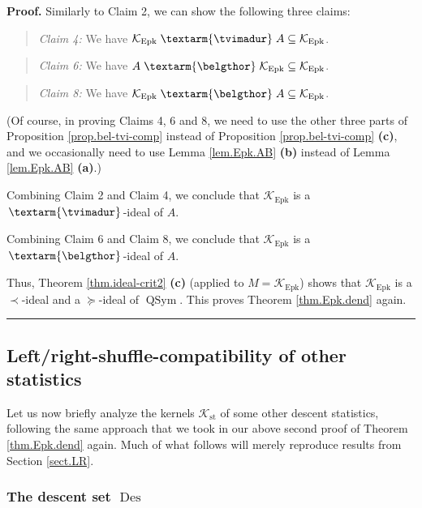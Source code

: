 \documentclass[numbers=enddot,12pt,final,onecolumn,notitlepage]{scrartcl}%
\theoremstyle{definition}
\newenvironment{statement}{\begin{quote}}{\end{quote}}
\newenvironment{proof}[1][Proof]{\noindent\textbf{#1.} }{\ \rule{0.5em}{0.5em}}
\newenvironment{verlong}{}{}
\newcommand{\tvi}{\left. \textarm{\tvimadur} \right.}
\newcommand{\bel}{\left. \textarm{\belgthor} \right.}
\begin{document}
\begin{verlong}
\begin{proof}
Similarly to Claim 2, we can show the following three claims:

\begin{statement}
\textit{Claim 4:} We have $\mathcal{K}_{\operatorname*{Epk}}\tvi
A\subseteq\mathcal{K}_{\operatorname*{Epk}}$.
\end{statement}

\begin{statement}
\textit{Claim 6:} We have $A\bel\mathcal{K}_{\operatorname*{Epk}}%
\subseteq\mathcal{K}_{\operatorname*{Epk}}$.
\end{statement}

\begin{statement}
\textit{Claim 8:} We have $\mathcal{K}_{\operatorname*{Epk}}\bel
A\subseteq\mathcal{K}_{\operatorname*{Epk}}$.
\end{statement}

(Of course, in proving Claims 4, 6 and 8, we need to use the other three parts
of Proposition \ref{prop.bel-tvi-comp} instead of Proposition
\ref{prop.bel-tvi-comp} \textbf{(c)}, and we occasionally need to use Lemma
\ref{lem.Epk.AB} \textbf{(b)} instead of Lemma \ref{lem.Epk.AB} \textbf{(a)}.)

Combining Claim 2 and Claim 4, we conclude that $\mathcal{K}%
_{\operatorname*{Epk}}$ is a $\tvi$-ideal of $A$.

Combining Claim 6 and Claim 8, we conclude that $\mathcal{K}%
_{\operatorname*{Epk}}$ is a $\bel$-ideal of $A$.

Thus, Theorem \ref{thm.ideal-crit2} \textbf{(c)} (applied to $M=\mathcal{K}%
_{\operatorname*{Epk}}$) shows that $\mathcal{K}_{\operatorname*{Epk}}$ is a
$\left.  \prec\right.  $-ideal and a $\left.  \succeq\right.  $-ideal of
$\operatorname*{QSym}$. This proves Theorem \ref{thm.Epk.dend} again.
\end{proof}

\subsection{\label{subsect.dendri.other-stats}Left/right-shuffle-compatibility
of other statistics}

Let us now briefly analyze the kernels $\mathcal{K}_{\operatorname*{st}}$ of
some other descent statistics, following the same approach that we took in our
above second proof of Theorem \ref{thm.Epk.dend} again. Much of what follows
will merely reproduce results from Section \ref{sect.LR}.

\subsubsection{The descent set $\operatorname*{Des}$}


\end{verlong}
\end{document}
